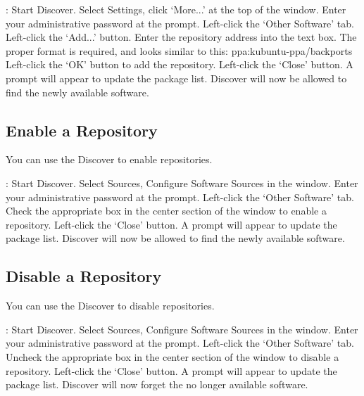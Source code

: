 \documentclass[letterpaper,10pt,english]{sphinxmanual}
\begin{document}
: Start Discover. Select Settings, click `More...' at the top of the window. Enter your administrative password at the prompt. Left-click the `Other Software' tab. Left-click the `Add...' button. Enter the repository address into the text box. The proper format is required, and looks similar to this: ppa:kubuntu-ppa/backports Left-click the `OK' button to add the repository. Left-click the `Close' button. A prompt will appear to update the package list. Discover will now be allowed to find the newly available software.





\subsection{Enable a Repository}
\label{\detokenize{docs/repositories:enable-a-repository}}
You can use the Discover to enable repositories.

: Start Discover. Select Sources, Configure Software Sources in the window. Enter your administrative password at the prompt. Left-click the `Other Software' tab. Check the appropriate box in the center section of the window to enable a repository. Left-click the `Close' button. A prompt will appear to update the package list. Discover will now be allowed to find the newly available software.


\subsection{Disable a Repository}
\label{\detokenize{docs/repositories:disable-a-repository}}
You can use the Discover to disable repositories.

: Start Discover. Select Sources, Configure Software Sources in the window. Enter your administrative password at the prompt. Left-click the `Other Software' tab. Uncheck the appropriate box in the center section of the window to disable a repository. Left-click the `Close' button. A prompt will appear to update the package list. Discover will now forget the no longer available software.
\end{document}
